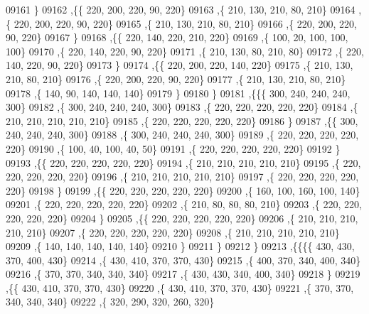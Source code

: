 \begin{DoxyCode}
09161     \}
09162    ,\{\{   220,   200,   220,    90,   220\}
09163     ,\{   210,   130,   210,    80,   210\}
09164     ,\{   220,   200,   220,    90,   220\}
09165     ,\{   210,   130,   210,    80,   210\}
09166     ,\{   220,   200,   220,    90,   220\}
09167     \}
09168    ,\{\{   220,   140,   220,   210,   220\}
09169     ,\{   100,    20,   100,   100,   100\}
09170     ,\{   220,   140,   220,    90,   220\}
09171     ,\{   210,   130,    80,   210,    80\}
09172     ,\{   220,   140,   220,    90,   220\}
09173     \}
09174    ,\{\{   220,   200,   220,   140,   220\}
09175     ,\{   210,   130,   210,    80,   210\}
09176     ,\{   220,   200,   220,    90,   220\}
09177     ,\{   210,   130,   210,    80,   210\}
09178     ,\{   140,    90,   140,   140,   140\}
09179     \}
09180    \}
09181   ,\{\{\{   300,   240,   240,   240,   300\}
09182     ,\{   300,   240,   240,   240,   300\}
09183     ,\{   220,   220,   220,   220,   220\}
09184     ,\{   210,   210,   210,   210,   210\}
09185     ,\{   220,   220,   220,   220,   220\}
09186     \}
09187    ,\{\{   300,   240,   240,   240,   300\}
09188     ,\{   300,   240,   240,   240,   300\}
09189     ,\{   220,   220,   220,   220,   220\}
09190     ,\{   100,    40,   100,    40,    50\}
09191     ,\{   220,   220,   220,   220,   220\}
09192     \}
09193    ,\{\{   220,   220,   220,   220,   220\}
09194     ,\{   210,   210,   210,   210,   210\}
09195     ,\{   220,   220,   220,   220,   220\}
09196     ,\{   210,   210,   210,   210,   210\}
09197     ,\{   220,   220,   220,   220,   220\}
09198     \}
09199    ,\{\{   220,   220,   220,   220,   220\}
09200     ,\{   160,   100,   160,   100,   140\}
09201     ,\{   220,   220,   220,   220,   220\}
09202     ,\{   210,    80,    80,    80,   210\}
09203     ,\{   220,   220,   220,   220,   220\}
09204     \}
09205    ,\{\{   220,   220,   220,   220,   220\}
09206     ,\{   210,   210,   210,   210,   210\}
09207     ,\{   220,   220,   220,   220,   220\}
09208     ,\{   210,   210,   210,   210,   210\}
09209     ,\{   140,   140,   140,   140,   140\}
09210     \}
09211    \}
09212   \}
09213  ,\{\{\{\{   430,   430,   370,   400,   430\}
09214     ,\{   430,   410,   370,   370,   430\}
09215     ,\{   400,   370,   340,   400,   340\}
09216     ,\{   370,   370,   340,   340,   340\}
09217     ,\{   430,   430,   340,   400,   340\}
09218     \}
09219    ,\{\{   430,   410,   370,   370,   430\}
09220     ,\{   430,   410,   370,   370,   430\}
09221     ,\{   370,   370,   340,   340,   340\}
09222     ,\{   320,   290,   320,   260,   320\}

\end{DoxyCode}

